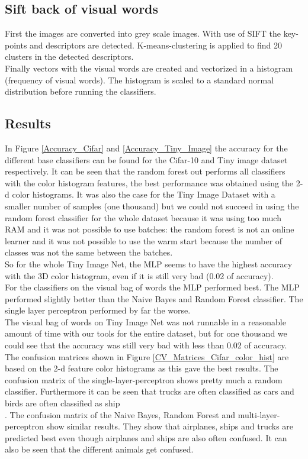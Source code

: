 \documentclass[11pt]{article}
\begin{document}
\subsection{Sift back of visual words}
First the images are converted into grey scale images. With use of SIFT the key-points and descriptors are detected. K-means-clustering is applied to find 20 clusters in the detected descriptors. \\
Finally vectors with the visual words are created and vectorized in a histogram (frequency of visual words). The histogram is scaled to a standard normal distribution before running the classifiers.   
\subsection{Results}
In Figure \ref{Accuracy_Cifar} and \ref{Accuracy_Tiny_Image} the accuracy for the different base classifiers can be found for the Cifar-10 and Tiny image dataset respectively. 
It can be seen that the random forest out performs all classifiers with the color histogram features, the best performance was obtained using the 2-d color histograms. It was also the case for the Tiny Image Dataset with a smaller number of samples (one thousand) but we could not succeed in using the random forest classifier for the whole dataset because it was using too much RAM and it was not possible to use batches: the random forest is not an online learner and it was not possible to use the warm start because the number of classes was not the same between the batches. \\
So for the whole Tiny Image Net, the MLP seems to have the highest accuracy with the 3D color histogram, even if it is still very bad (0.02 of accuracy).\\
%
For the classifiers on the visual bag of words the MLP performed best. The MLP performed slightly better than the Naive Bayes and Random Forest classifier. The single layer perceptron performed by far the worse.  \\
The visual bag of words on Tiny Image Net was not runnable in a reasonable amount of time with our tools for the entire dataset, but for one thousand we could see that the accuracy was still very bad with less than 0.02 of accuracy.
%
The confusion matrices shown in Figure \ref{CV_Matrices_Cifar_color_hist} are based on the 2-d feature color histograms as this gave the best results. The confusion matrix of the single-layer-perceptron shows pretty much a random classifier. Furthermore it can be seen that trucks are often classified as cars and birds are often classified as ship\\. 
The confusion matrix of the Naive Bayes, Random Forest and multi-layer-perceptron show similar results. They show that airplanes, ships and trucks are predicted best even though airplanes and ships are also often confused. It can also be seen that the different animals get confused.
\end{document}
